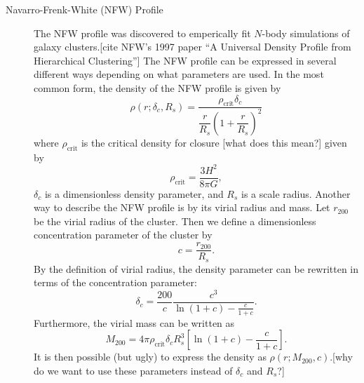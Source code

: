 \documentclass[10pt,twoside]{article}
\theoremstyle{definition}
\theoremstyle{exercise}
\begin{document}
\begin{description}
  \item[Navarro-Frenk-White (NFW) Profile] The NFW profile was discovered to emperically fit $N$-body simulations of galaxy clusters.[cite NFW's 1997 paper ``A Universal Density Proﬁle from Hierarchical Clustering''] The NFW profile can be expressed in several different ways depending on what parameters are used. In the most common form, the density of the NFW profile is given by
    \begin{equation}
      \rho(r; \delta_c, R_s) = \frac{\rho_\text{crit}\delta_c}{\dfrac{r}{R_s}\left( 1+\dfrac{r}{R_s} \right)^2}
      \label{eq:NFW_density}
    \end{equation}
    where $\rho_\text{crit}$ is the critical density for closure [what does this mean?] given by
    \begin{equation}
      \rho_\text{crit} = \frac{3H^2}{8\pi G},
      \label{eq:rho_crit}
    \end{equation}
    $\delta_c$ is a dimensionless density parameter, and $R_s$ is a scale radius. Another way to describe the NFW profile is by its virial radius and mass. Let $r_{200}$ be the virial radius of the cluster. Then we define a dimensionless concentration parameter of the cluster by
    \begin{equation}
      c = \frac{r_{200}}{R_s}.
      \label{eq:concentration_parameter}
    \end{equation}
    By the definition of virial radius, the density parameter can be rewritten in terms of the concentration parameter:
    \begin{equation}
      \delta_c = \frac{200}{c} \frac{c^3}{\ln(1+c)-\frac{c}{1+c}}.     
      \label{eq:delta_c}
    \end{equation}
Furthermore, the virial mass can be written as
\begin{equation}
  M_{200} = 4\pi\rho_\text{crit}\delta_cR_s^3\left[ \ln(1+c) - \frac{c}{1+c} \right].
  \label{eq:virial_mass}
\end{equation}
It is then possible (but ugly) to express the density as $\rho(r; M_{200}, c)$.[why do we want to use these parameters instead of $\delta_c$ and $R_s$?]



\end{description}
\end{document}
